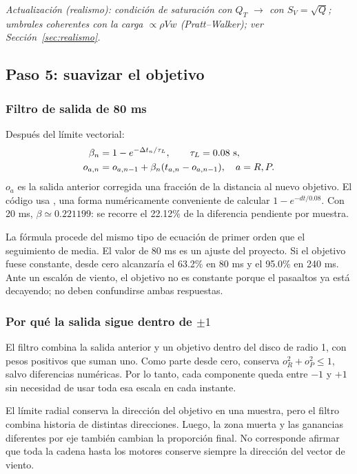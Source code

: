 \documentclass[11pt,a4paper]{article}
\newcommand{\code}[1]{\texttt{\detokenize{#1}}}
\begin{document}
\textit{Actualización (realismo): condición de saturación con $Q_T$ $\rightarrow$ con $S_V=\sqrt Q$; umbrales coherentes con la carga $\propto\rho Vw$ (Pratt--Walker); ver Sección~\ref{sec:realismo}.}

\subsection{Paso 5: suavizar el objetivo}
\subsubsection{Filtro de salida de 80 ms}
Después del límite vectorial:
\begin{align}
\beta_n&=1-e^{-\Delta t_n/\tau_L},\qquad \tau_L=0.08\ {\rm s},\\
o_{a,n}&=o_{a,n-1}+\beta_n(t_{a,n}-o_{a,n-1}),\quad a=R,P.
\label{eq:turb-lp}
\end{align}
$o_a$ es la salida anterior corregida una fracción de la distancia al nuevo objetivo. El código usa \code{-expm1(-dt/0.08)}, una forma numéricamente conveniente de calcular $1-e^{-dt/0.08}$. Con 20 ms, $\beta\simeq0.221199$: se recorre el 22.12\% de la diferencia pendiente por muestra.

La fórmula procede del mismo tipo de ecuación de primer orden que el seguimiento de media. El valor de 80 ms es un ajuste del proyecto. Si el objetivo fuese constante, desde cero alcanzaría el 63.2\% en 80 ms y el 95.0\% en 240 ms. Ante un escalón de viento, el objetivo no es constante porque el pasaaltos ya está decayendo; no deben confundirse ambas respuestas.

\subsubsection{Por qué la salida sigue dentro de $\pm1$}
El filtro combina la salida anterior y un objetivo dentro del disco de radio 1, con pesos positivos que suman uno. Como parte desde cero, conserva $o_R^2+o_P^2\le1$, salvo diferencias numéricas. Por lo tanto, cada componente queda entre $-1$ y $+1$ sin necesidad de usar toda esa escala en cada instante.

El límite radial conserva la dirección del objetivo en una muestra, pero el filtro combina historia de distintas direcciones. Luego, la zona muerta y las ganancias diferentes por eje también cambian la proporción final. No corresponde afirmar que toda la cadena hasta los motores conserve siempre la dirección del vector de viento.
\end{document}
